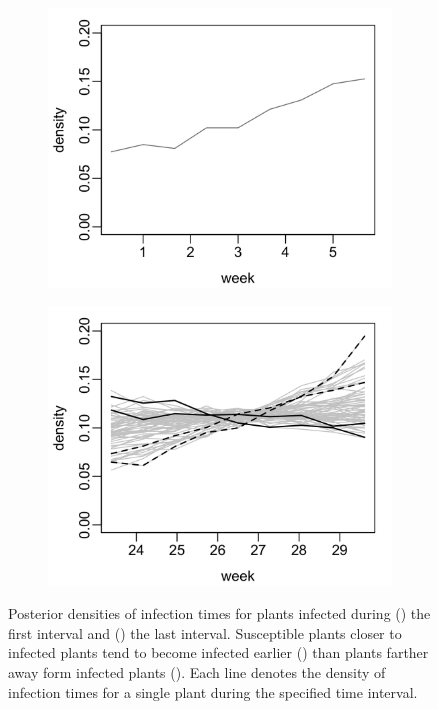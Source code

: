 \documentclass{uwstat572}
\newcommand{\blackline}{\raisebox{2pt}{\tikz{\draw[-,black,solid,line width = 1.5pt](0,0) -- (8mm,0);}}}
\newcommand{\blackdashline}{\raisebox{2pt}{\tikz{\draw[-,black,dashed,line width = 1.5pt](0,0) -- (8mm,0);}}}
\begin{document}
\begin{figure}[t!]
	\centering
	\begin{subfigure}[b]{0.49\textwidth}
		\includegraphics[width=\textwidth]{figures/figure_3a.png}
		\caption{}
		\label{fig:first_infections}
	\end{subfigure}
	\hfill
	\begin{subfigure}[b]{0.49\textwidth}
		\includegraphics[width=\textwidth]{figures/figure_3b.png}
		\caption{}
		\label{fig:last_infections}
	\end{subfigure}
	\caption{Posterior densities of infection times for plants infected during () the first interval and () the last interval. Susceptible plants closer to infected plants tend to become infected earlier (\protect\blackline) than plants farther away form infected plants (\protect\blackdashline). Each line denotes the density of infection times for a single plant during the specified time interval.}
	\label{fig:time_plots}
\end{figure} 
\end{document}
